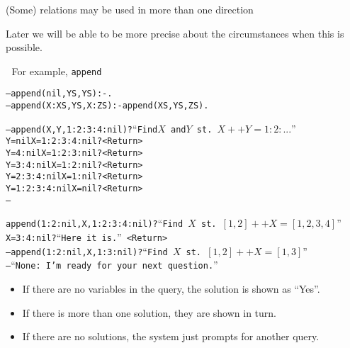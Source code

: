 \documentclass{popl}
\def\user#1{{#1}}
\def\Return{{\scriptsize\tt\user{<Return>}}}
\newenvironment{smalltt}{\begin{alltt}\smaller}{\end{alltt}}
\newcommand{\rmbox}[1]{\mbox{{\rm #1}}}
\begin{document}
\begin{foil}
(Some) relations may be used in more than one direction
\begin{note}
Later we will be able to be more precise about the
circumstances when this is possible.
\end{note}

For example, {\tt append}
\begin{smalltt}
-- \user{append(nil,  YS, YS) :- .}
-- \user{append(X:XS, YS, X:ZS) :- append(XS, YS, ZS).}

-- \user{append(X, Y, 1:2:3:4:nil)?}       \rmbox{``Find\(X\) and\(Y\) st. \(X++Y=1:2:...\)''}
Y = nil X = 1 : 2 : 3 : 4 : nil ?   \rmbox{\Return} 
Y = 4 : nil X = 1 : 2 : 3 : nil ?   \rmbox{\Return}
Y = 3 : 4 : nil X = 1 : 2 : nil ?   \rmbox{\Return}
Y = 2 : 3 : 4 : nil X = 1 : nil ?   \rmbox{\Return}
Y = 1 : 2 : 3 : 4 : nil X = nil ?   \rmbox{\Return}
--                                  
\end{smalltt}
\begin{smalltt}
   \user{append(1:2:nil, X, 1:2:3:4:nil)?} \rmbox{``Find \(X\) st. \([1,2]++X=[1,2,3,4]\)''}
X = 3 : 4 : nil ?                   \rmbox{``Here it is.'' \Return}
-- \user{append(1:2:nil, X, 1:3:nil)?}     \rmbox{``Find \(X\) st. \([1,2]++X=[1,3]\)''}
--                                  \rmbox{``None: I'm ready for your next question.''}
\end{smalltt}

\begin{itemize}
\item If there are no variables in the query, the solution is shown as ``Yes''.
\item If there is more than one solution, they are shown in turn.
\item If there are no solutions, the system just prompts for another query.
\end{itemize}\end{foil}
\end{document}
